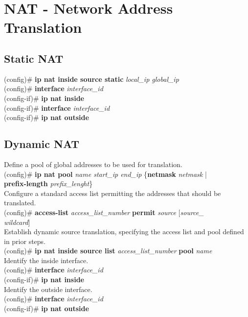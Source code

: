 \section{NAT - Network Address Translation}
\subsection{Static NAT}
(config)\# \textbf{ip nat inside source static} \textit{local\_ip global\_ip}\\
(config)\# \textbf{interface} \textit{interface\_id}\\
(config-if)\# \textbf{ip nat inside}\\
(config-if)\# \textbf{interface} \textit{interface\_id}\\
(config-if)\# \textbf{ip nat outside}
\subsection{Dynamic NAT}
\textrm{Define a pool of global addresses to be used for translation.}\\
(config)\# \textbf{ip nat pool} \textit{name start\_ip end\_ip} \{\textbf{netmask} \textit{netmask} | \\\textbf{prefix-length} \textit{prefix\_lenght}\}\vspace{11pt}\\
\textrm{Configure a standard access list permitting the addresses that should be translated.}\\
(config)\# \textbf{access-list} \textit{access\_list\_number} \textbf{permit} \textit{source} [\textit{source\_\\wildcard}]\vspace{11pt}\\
\textrm{Establish dynamic source translation, specifying the access list and pool defined in prior steps.}\\
(config)\# \textbf{ip nat inside source list} \textit{access\_list\_number} \textbf{pool} \textit{name}\vspace{11pt}\\
\textrm{Identify the inside interface.}\\
(config)\# \textbf{interface} \textit{interface\_id}\\
(config-if)\# \textbf{ip nat inside}\vspace{11pt}\\
\textrm{Identify the outside interface.}\\
(config)\# \textbf{interface} \textit{interface\_id}\\
(config-if)\# \textbf{ip nat outside}
